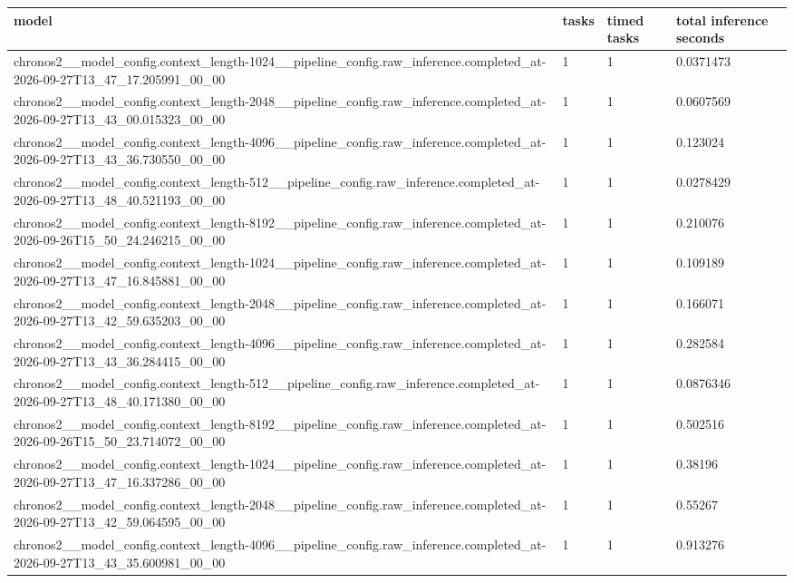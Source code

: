 \begin{tabular}{llll}
\toprule
model & tasks & timed tasks & total inference seconds \\
\midrule
chronos2\_\_model\_config.context\_length-1024\_\_pipeline\_config.raw\_inference.completed\_at-2026-09-27T13\_47\_17.205991\_00\_00 & 1 & 1 & 0.0371473 \\
chronos2\_\_model\_config.context\_length-2048\_\_pipeline\_config.raw\_inference.completed\_at-2026-09-27T13\_43\_00.015323\_00\_00 & 1 & 1 & 0.0607569 \\
chronos2\_\_model\_config.context\_length-4096\_\_pipeline\_config.raw\_inference.completed\_at-2026-09-27T13\_43\_36.730550\_00\_00 & 1 & 1 & 0.123024 \\
chronos2\_\_model\_config.context\_length-512\_\_pipeline\_config.raw\_inference.completed\_at-2026-09-27T13\_48\_40.521193\_00\_00 & 1 & 1 & 0.0278429 \\
chronos2\_\_model\_config.context\_length-8192\_\_pipeline\_config.raw\_inference.completed\_at-2026-09-26T15\_50\_24.246215\_00\_00 & 1 & 1 & 0.210076 \\
chronos2\_\_model\_config.context\_length-1024\_\_pipeline\_config.raw\_inference.completed\_at-2026-09-27T13\_47\_16.845881\_00\_00 & 1 & 1 & 0.109189 \\
chronos2\_\_model\_config.context\_length-2048\_\_pipeline\_config.raw\_inference.completed\_at-2026-09-27T13\_42\_59.635203\_00\_00 & 1 & 1 & 0.166071 \\
chronos2\_\_model\_config.context\_length-4096\_\_pipeline\_config.raw\_inference.completed\_at-2026-09-27T13\_43\_36.284415\_00\_00 & 1 & 1 & 0.282584 \\
chronos2\_\_model\_config.context\_length-512\_\_pipeline\_config.raw\_inference.completed\_at-2026-09-27T13\_48\_40.171380\_00\_00 & 1 & 1 & 0.0876346 \\
chronos2\_\_model\_config.context\_length-8192\_\_pipeline\_config.raw\_inference.completed\_at-2026-09-26T15\_50\_23.714072\_00\_00 & 1 & 1 & 0.502516 \\
chronos2\_\_model\_config.context\_length-1024\_\_pipeline\_config.raw\_inference.completed\_at-2026-09-27T13\_47\_16.337286\_00\_00 & 1 & 1 & 0.38196 \\
chronos2\_\_model\_config.context\_length-2048\_\_pipeline\_config.raw\_inference.completed\_at-2026-09-27T13\_42\_59.064595\_00\_00 & 1 & 1 & 0.55267 \\
chronos2\_\_model\_config.context\_length-4096\_\_pipeline\_config.raw\_inference.completed\_at-2026-09-27T13\_43\_35.600981\_00\_00 & 1 & 1 & 0.913276 \\

\end{tabular}
